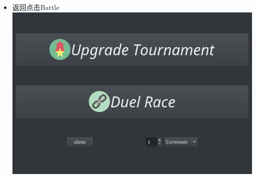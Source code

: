 \documentclass{article}
\begin{document}
\begin{itemize}
\item 返回点击Battle\\
  \includegraphics[width=15cm]{./pokemon/战斗选项.png}
  
\end{itemize}
\end{document}
